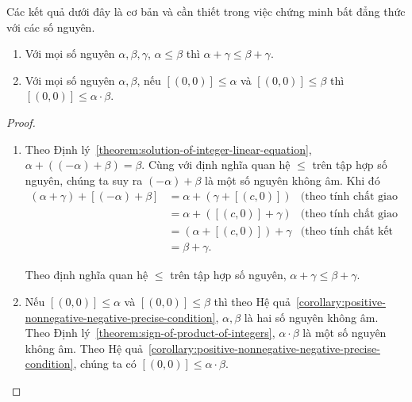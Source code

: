 Các kết quả dưới đây là cơ bản và cần thiết trong việc chứng minh bất đẳng thức với các số nguyên.
\begin{theorem}\label{theorem:integers-order-and-operations}
	\begin{enumerate}[label={(\roman*)}]
		\item Với mọi số nguyên $\alpha, \beta, \gamma$, $\alpha\leq \beta$ thì $\alpha + \gamma\leq \beta + \gamma$.
		\item Với mọi số nguyên $\alpha, \beta$, nếu $[(0,0)]\leq\alpha$ và $[(0,0)]\leq\beta$ thì $[(0,0)]\leq\alpha\cdot\beta$.
	\end{enumerate}
\end{theorem}

\begin{proof}
	\begin{enumerate}[label={(\roman*)}]
		\item Theo Định lý~\ref{theorem:solution-of-integer-linear-equation}, $\alpha + ((-\alpha) + \beta) = \beta$. Cùng với định nghĩa quan hệ $\leq$ trên tập hợp số nguyên, chúng ta suy ra $(-\alpha) + \beta$ là một số nguyên không âm. Khi đó
		      \begin{align*}
			      (\alpha + \gamma) + [(-\alpha) + \beta] & = \alpha + (\gamma + [(c, 0)]) & \text{(theo tính chất giao hoán của phép cộng số nguyên)} \\
			                                              & = \alpha + ([(c, 0)] + \gamma) & \text{(theo tính chất giao hoán của phép cộng số nguyên)} \\
			                                              & = (\alpha + [(c, 0)]) + \gamma & \text{(theo tính chất kết hợp của phép cộng số nguyên)}   \\
			                                              & = \beta + \gamma.
		      \end{align*}

		      Theo định nghĩa quan hệ $\leq$ trên tập hợp số nguyên, $\alpha + \gamma\leq \beta + \gamma$.
		\item Nếu $[(0,0)]\leq\alpha$ và $[(0,0)]\leq\beta$ thì theo Hệ quả~\ref{corollary:positive-nonnegative-negative-precise-condition}, $\alpha, \beta$ là hai số nguyên không âm. Theo Định lý~\ref{theorem:sign-of-product-of-integers}, $\alpha\cdot\beta$ là một số nguyên không âm. Theo Hệ quả~\ref{corollary:positive-nonnegative-negative-precise-condition}, chúng ta có $[(0,0)]\leq \alpha\cdot\beta$.
	\end{enumerate}
\end{proof}

